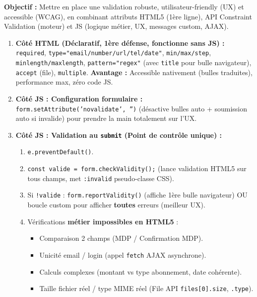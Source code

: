 \documentclass[11pt]{article}
\newcommand{\cle}[1]{{\popxbold\color{popdark}#1}}
\begin{document}
\begin{methode}
    \textbf{Objectif :} Mettre en place une validation robuste, utilisateur-friendly (\cle{UX}) et accessible (\cle{WCAG}), en combinant attributs HTML5 (1ère ligne), API Constraint Validation (moteur) et JS (logique métier, UX, messages custom, AJAX).
    \begin{enumerate}
        \item \textbf{Côté HTML (Déclaratif, 1ère défense, fonctionne sans JS) :}
              \texttt{required}, \texttt{type="email/number/url/tel/date"}, \texttt{min/max/step}, \texttt{minlength/maxlength}, \texttt{pattern="regex"} (avec \texttt{title} pour bulle navigateur), \texttt{accept} (file), \texttt{multiple}. \textbf{Avantage :} Accessible nativement (bulles traduites), performance max, zéro code JS.
        \item \textbf{Côté JS : Configuration formulaire :} \texttt{form.setAttribute('novalidate', '')} (désactive bulles auto + soumission auto si invalide) pour prendre la main totalement sur l'UX.
        \item \textbf{Côté JS : Validation au \texttt{submit} (Point de contrôle unique) :}
              \begin{enumerate}
                  \item \texttt{e.preventDefault()}.
                  \item \texttt{const valide = form.checkValidity();} (lance validation HTML5 sur tous champs, met \texttt{:invalid} pseudo-classe CSS).
                  \item Si \texttt{!valide} : \texttt{form.reportValidity()} (affiche 1ère bulle navigateur) OU boucle custom pour afficher \textbf{toutes} erreurs (meilleur UX).
                  \item Vérifications \textbf{métier impossibles en HTML5} :
                        \begin{itemize}
                            \item Comparaison 2 champs (MDP / Confirmation MDP).
                            \item Unicité email / login (appel \texttt{fetch} AJAX asynchrone).
                            \item Calculs complexes (montant vs type abonnement, date cohérente).
                            \item Taille fichier réel / type MIME réel (File API \texttt{files[0].size}, \texttt{.type}).

\end{itemize}
\end{enumerate}
\end{enumerate}
\end{methode}
\end{document}
